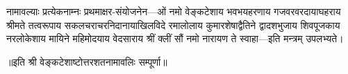 नामावल्याः प्रत्येकनाम्नः प्रथमाक्षर-संयोजनेन---ओं नमो वेङ्कटेशाय
भवभयहरणाय
गजवरवरदायाघहराय
श्रीमते तत्वरूपाय
सकलचराचरनिदानायाखिलविदे
रमालोलाय
कुमारशेषाद्वैतिने
द्वादशभुजाय
शिवपूजकाय
नरलोकेशाय
मायिने
महिमोदयाय
वेदसाराय
श्रीं क्लीं सौं
नमो नारायण ते स्वाहा---इति मन्त्रम् उपलभ्यते।

॥इति श्री वेङ्कटेशाष्टोत्तरशतनामावलिः सम्पूर्णा॥
